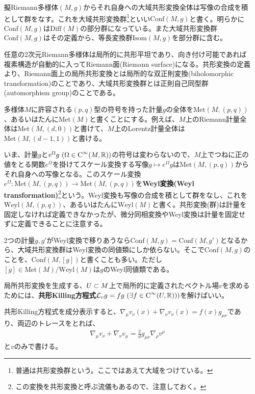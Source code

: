 擬Riemann多様体$(M,g)$からそれ自身への大域共形変換全体は写像の合成を積として群をなす。これを大域共形変換群\footnote{普通は共形変換群という。ここではあえて大域をつけている。}といい$\text{Conf}(M,g)$と書く。明らかに$\text{Conf}(M,g)$は$\text{Diff}(M)$の部分群になっている。また大域共形変換群$\text{Conf}(M,g)$はその定義から、等長変換群$\text{Isom}(M,g)$を部分群に含む。

\begin{ex}
任意の2次元Riemann多様体は局所的に共形平坦\footnotemark であり、向き付け可能であれば複素構造が自動的に入ってRiemann面(Riemann surface)になる。共形変換の定義より、Riemann面上の局所共形変換とは局所的な双正則変換(biholomorphic transformation)のことであり、大域共形変換群とは正則自己同型群(automorphism group)のことである。
\end{ex}

多様体$M$に許容される$(p,q)$型の符号を持った計量$g$の全体を$\text{Met}(M,(p,q))$、あるいはたんに$\text{Met}(M)$と書くことにする。例えば、$M$上のRiemann計量全体は$\text{Met}(M,(d,0))$と書けて、$M$上のLorentz計量全体は$\text{Met}(M,(d-1,1))$と書ける。

いま、計量$g$と$e^\Omega g\ (\Omega\in\text{C}^\infty(M,\R))$の符号は変わらないので、$M$上でつねに正の値をとる関数$e^\Omega$を掛けてスケール変換する写像$g\mapsto e^\Omega g$は$\text{Met}(M,(p,q))$からそれ自身への写像となる。このスケール変換$e^\Omega\colon \text{Met}(M,(p,q))\to \text{Met}(M,(p,q))$を\textbf{Weyl変換(Weyl transformation)}\footnote{この変換を共形変換と呼ぶ流儀もあるので、注意しておく。}という。Weyl変換も写像の合成を積として群をなし、これを$\text{Weyl}(M,(p,q))$、あるいはたんに$\text{Weyl}(M)$と書く。共形変換(群)は計量を固定しなければ定義できなかったが、微分同相変換やWeyl変換は計量を固定せずに定義できることに注意する。

2つの計量$g,g'$がWeyl変換で移りあうなら$\text{Conf}(M,g)=\text{Conf}(M,g')$となるから、大域共形変換群はWeyl変換の同値類にしか依らない。そこで$\text{Conf}(M,g)$のことを、$\text{Conf}(M,[g])$と書くことも多い。ただし$[g]\in\text{Met}(M)/\text{Weyl}(M)$は$g$のWeyl同値類である。

局所共形変換を生成する、$U\subset M$上で局所的に定義されたベクトル場$v$を求めるためには、\textbf{共形Killing方程式}$\mathcal{L}_v g=fg\ (\exists f\in\text{C}^\infty(U,\mathbb{R})))$を解けばいい。

共形Killing方程式を成分表示すると、$\nabla_\mu v_\nu(x)+\nabla_\nu v_\nu(x)=f(x)g_{\mu\nu}$であり、両辺のトレースをとれば、
\begin{align}\label{confkilling}
\nabla_\mu v_\nu+\nabla_\nu v_\mu=\frac{2}{d}g_{\mu\nu} \nabla_\rho v^\rho 
\end{align}
と$v$のみで書ける。


